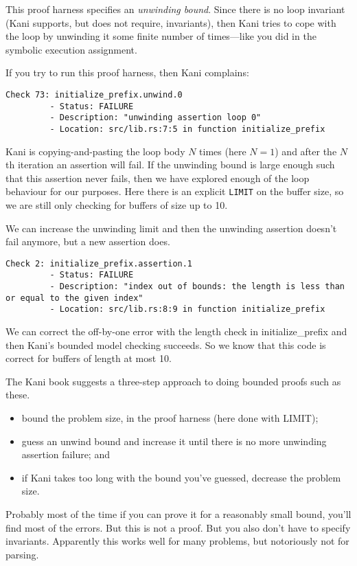 \documentclass[11pt]{article}
\begin{document}
This proof harness specifies an \emph{unwinding bound}. Since there is no loop
invariant (Kani supports, but does not require, invariants), then Kani tries to cope
with the loop by unwinding it some finite number of times---like you did in the symbolic
execution assignment.

If you try to run this proof harness, then Kani complains:
{\scriptsize
\begin{verbatim}
Check 73: initialize_prefix.unwind.0
         - Status: FAILURE
         - Description: "unwinding assertion loop 0"
         - Location: src/lib.rs:7:5 in function initialize_prefix
\end{verbatim}
}

Kani is copying-and-pasting the loop body $N$ times (here $N=1$) and
after the $N$th iteration an assertion will fail. If the unwinding bound
is large enough such that this assertion never fails, then we have explored
enough of the loop behaviour for our purposes. Here there is an explicit
\texttt{LIMIT} on the buffer size, so we are still only checking for buffers of
size up to 10.

We can increase the unwinding limit and then the unwinding assertion doesn't fail anymore,
but a new assertion does.
{\scriptsize
\begin{verbatim}
Check 2: initialize_prefix.assertion.1
         - Status: FAILURE
         - Description: "index out of bounds: the length is less than or equal to the given index"
         - Location: src/lib.rs:8:9 in function initialize_prefix
\end{verbatim}
}
We can correct the off-by-one error with the length check in \textsf{initialize\_prefix} and
then Kani's bounded model checking succeeds. So we know that this code is correct for buffers of
length at most 10.

The Kani book suggests a three-step approach to doing bounded proofs such as these.
\begin{itemize}[noitemsep]
\item bound the problem size, in the proof harness (here done with \textsf{LIMIT});
\item guess an  \textsf{unwind} bound and increase it until there is no more unwinding assertion failure; and
\item if Kani takes too long with the bound you've guessed, decrease the problem size.
\end{itemize}

Probably most of the time if you can prove it for a reasonably small bound, you'll find most of the errors.
But this is not a proof. But you also don't have to specify invariants. Apparently this works well for many
problems, but notoriously not for parsing.
\end{document}
